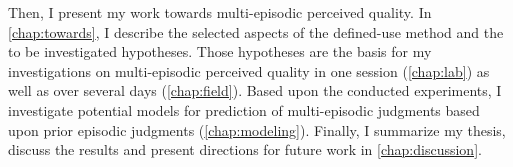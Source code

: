Then, I present my work towards multi-episodic perceived quality. %
In \autoref{chap:towards}, I describe the selected aspects of the defined-use method and the to be investigated hypotheses.
Those hypotheses are the basis for my investigations on multi-episodic perceived quality in one session (\autoref{chap:lab}) as well as over several days (\autoref{chap:field}).
Based upon the conducted experiments, I investigate potential models for prediction of multi-episodic judgments based upon prior episodic judgments (\autoref{chap:modeling}).
Finally, I summarize my thesis, discuss the results and present directions for future work in \autoref{chap:discussion}.